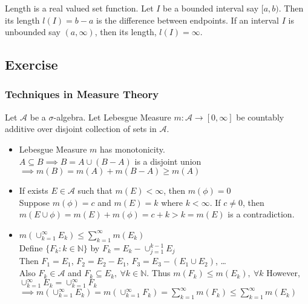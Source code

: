 \begin{definition}
	Length is a real valued set function. Let $I$ be a bounded interval say $[a,b)$. Then its length $l(I)=b-a$ is the difference between endpoints.
	If an interval $I$ is unbounded say $(a,\infty)$, then its length, $l(I) = \infty$.
\end{definition}


\subsection{Exercise}
\subsubsection{Techniques in Measure Theory}
	Let $\mathcal{A}$ be a $\sigma$-algebra. Let Lebesgue Measure $m : \mathcal{A} \to [0,\infty]$ be countably additive over disjoint collection of sets in $\mathcal{A}$.
\begin{itemize}
	\item Lebesgue Measure $m$ has monotonicity.\\
		$A \subseteq B \implies B = A \cup (B-A)$ is a disjoint union \\
		$\implies m(B) = m(A) + m(B-A) \ge m(A)$
	\item If exists $E \in \mathcal{A}$ such that $m(E) < \infty$, then $m(\phi) = 0$\\
		Suppose $m(\phi) = c$ and $m(E) = k$ where $k < \infty$. If $c \ne 0$, then $m(E \cup \phi) = m(E) + m(\phi) = c+k > k = m(E)$ is a contradiction.
	\item $m\left(\cup_{k=1}^\infty E_k\right) \le \sum_{k=1}^\infty m(E_k)$\\
		Define $\{ F_k : k \in \mathbb{N} \}$ by $F_k = E_k - \cup_{j = 1}^{k-1} E_j$\\
		Then $F_1 = E_1$, $F_2 = E_2 - E_1$, $F_3 = E_3 - (E_1 \cup E_2)$, \dots\\
		Also $F_k \in \mathcal{A}$ and $F_k \subseteq E_k,\ \forall k \in \mathbb{N}$. Thus $m(F_k) \le m(E_k),\ \forall k$
		However, $\cup_{k=1}^\infty E_k = \cup_{k=1}^\infty F_k$\\
		$\implies m\left( \cup_{k=1}^\infty E_k \right) = m \left( \cup_{k=1}^\infty F_k \right) = \sum_{k=1}^\infty m(F_k) \le \sum_{k=1}^\infty m(E_k)$
\end{itemize}

